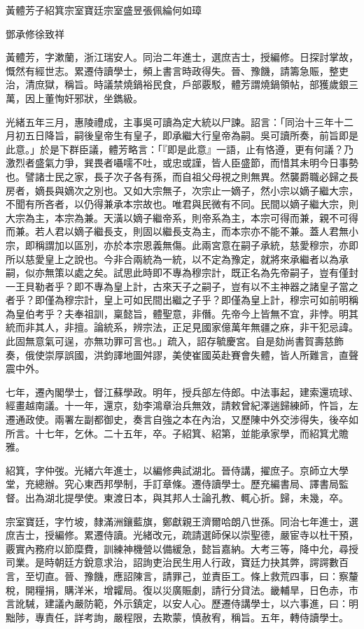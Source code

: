 
\begin{pinyinscope}
黃體芳子紹箕宗室寶廷宗室盛昱張佩綸何如璋

鄧承修徐致祥

黃體芳，字漱蘭，浙江瑞安人。同治二年進士，選庶吉士，授編修。日探討掌故，慨然有經世志。累遷侍讀學士，頻上書言時政得失。晉、豫饑，請籌急賑，整吏治，清庶獄，稱旨。時議禁燒鍋裕民食，戶部覈駁，體芳謂燒鍋領帖，部獲歲銀三萬，因上董恂奸邪狀，坐鐫級。

光緒五年三月，惠陵禮成，主事吳可讀為定大統以尸諫。詔言：「同治十三年十二月初五日降旨，嗣後皇帝生有皇子，即承繼大行皇帝為嗣。吳可讀所奏，前旨即是此意。」於是下群臣議，體芳略言：「『即是此意』一語，止有恪遵，更有何議？乃激烈者盛氣力爭，巽畏者囁嚅不吐，或忠或謹，皆人臣盛節，而惜其未明今日事勢也。譬諸士民之家，長子次子各有孫，而自祖父母視之則無異。然襲爵職必歸之長房者，嫡長與嫡次之別也。又如大宗無子，次宗止一嫡子，然小宗以嫡子繼大宗，不聞有所吝者，以仍得兼承本宗故也。唯君與民微有不同。民間以嫡子繼大宗，則大宗為主，本宗為兼。天潢以嫡子繼帝系，則帝系為主，本宗可得而兼，親不可得而兼。若人君以嫡子繼長支，則固以繼長支為主，而本宗亦不能不兼。蓋人君無小宗，即稱謂加以區別，亦於本宗恩義無傷。此兩宮意在嗣子承統，慈愛穆宗，亦即所以慈愛皇上之說也。今非合兩統為一統，以不定為豫定，就將來承繼者以為承嗣，似亦無策以處之矣。試思此時即不專為穆宗計，既正名為先帝嗣子，豈有僅封一王貝勒者乎？即不專為皇上計，古來天子之嗣子，豈有以不主神器之諸皇子當之者乎？即僅為穆宗計，皇上可如民間出繼之子乎？即僅為皇上計，穆宗可如前明稱為皇伯考乎？夫奉祖訓，稟懿旨，體聖意，非僭。先帝今上皆無不宜，非悖。明其統而非其人，非擅。論統系，辨宗法，正足見國家億萬年無疆之庥，非干犯忌諱。此固無意氣可逞，亦無功罪可言也。」疏入，詔存毓慶宮。自是劾尚書賀壽慈飾奏，俄使崇厚誤國，洪鈞譯地圖舛謬，美使崔國英赴賽會失體，皆人所難言，直聲震中外。

七年，遷內閣學士，督江蘇學政。明年，授兵部左侍郎。中法事起，建索還琉球、經畫越南議。十一年，還京，劾李鴻章治兵無效，請敕曾紀澤遄歸練師，忤旨，左遷通政使。兩署左副都御史，奏言自強之本在內治，又歷陳中外交涉得失，後卒如所言。十七年，乞休。二十五年，卒。子紹箕、紹第，並能承家學，而紹箕尤贍雅。

紹箕，字仲弢。光緒六年進士，以編修典試湖北。晉侍講，擢庶子。京師立大學堂，充總辦。究心東西邦學制，手訂章條。遷侍讀學士。歷充編書局、譯書局監督。出為湖北提學使。東渡日本，與其邦人士論孔教、輒心折。歸，未幾，卒。

宗室寶廷，字竹坡，隸滿洲鑲藍旗，鄭獻親王濟爾哈朗八世孫。同治七年進士，選庶吉士，授編修。累遷侍讀。光緒改元，疏請選師保以崇聖德，嚴宦寺以杜干預，覈實內務府以節糜費，訓練神機營以備緩急，懿旨嘉納。大考三等，降中允，尋授司業。是時朝廷方銳意求治，詔詢吏治民生用人行政，寶廷力抉其弊，諤諤數百言，至切直。晉、豫饑，應詔陳言，請罪己，並責臣工。條上救荒四事，曰：察釐稅，開糧捐，購洋米，增糶局。復以災廣賑劇，請行分貸法。畿輔旱，日色赤，市言訛駴，建議內嚴防範，外示鎮定，以安人心。歷遷侍講學士，以六事進，曰：明黜陟，專責任，詳考詢，嚴程限，去欺蒙，慎赦宥，稱旨。五年，轉侍讀學士。


\end{pinyinscope}
